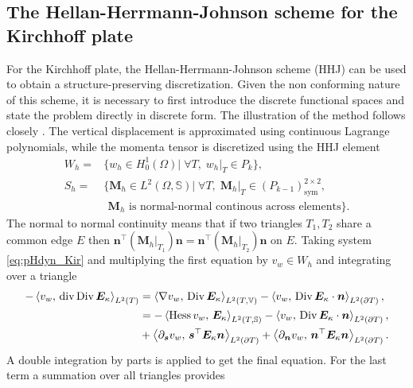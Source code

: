 \subsection{The  Hellan-Herrmann-Johnson scheme for the Kirchhoff plate}\label{sec:HHJ}
For the Kirchhoff plate, the Hellan-Herrmann-Johnson scheme \cite{hellan1967,herrmann1967finite,johnson1973convergence} (HHJ) can be used to obtain a structure-preserving discretization. Given the non conforming nature of this scheme, it is necessary to first introduce the discrete functional spaces and state the problem directly in discrete form. The illustration of the method follows closely \cite{arnold2019hellan}. The vertical displacement is approximated using continuous Lagrange polynomials, while the momenta tensor is discretized using the HHJ element
\begin{equation}
\label{eq:HHJ}
\begin{aligned}
W_h = &\{w_h \in H^1_0(\Omega)| \; \forall T, \; w_h|_{T} \in P_{k} \}, \\
S_h = &\{\bm{M}_h \in L^2(\Omega, \mathbb{S})| \; \forall T, \; \bm{M}_h|_{T} \in (P_{k-1})^{2\times 2}_{\text{sym}} , \\ 
&\, \ \bm{M}_h \text{ is normal-normal continous across elements}\}.
\end{aligned}
\end{equation}
The normal to normal continuity means that if two triangles $T_1, T_2$ share a common edge $E$ then $\bm{n}^\top (\bm{M}_h|_{T_1}) \bm{n} = \bm{n}^\top (\bm{M}_h|_{T_2}) \bm{n}$ on $E$. Taking system \eqref{eq:pHdyn_Kir} and multiplying the first equation by $v_w \in W_h$ and integrating over a triangle
\begin{equation*}
\begin{aligned}
- \inner[L^2(T)]{v_w}{\div\Div \bm{E}_\kappa} &= \inner[L^2(T, \mathbb{V})]{\nabla v_w}{\Div \bm{E}_\kappa} - \inner[L^2(\partial T)]{v_w}{\Div \bm{E}_\kappa \cdot \bm{n}}, \\
&=-\inner[L^2(T, \mathbb{S})]{\Hess v_w}{\bm{E}_\kappa} - \inner[L^2(\partial T)]{v_w}{\Div \bm{E}_\kappa \cdot \bm{n}}, \\
&+\inner[L^2(\partial T)]{\partial_{\bm{s}} v_w}{\bm{s}^\top\bm{E}_\kappa \bm{n}} + \inner[L^2(\partial T)]{\partial_{\bm{n}} v_w}{\bm{n}^\top\bm{E}_\kappa \bm{n}}. \\
\end{aligned}
\end{equation*}
A double integration by parts is applied to get the final equation. For the last term a summation over all triangles provides
